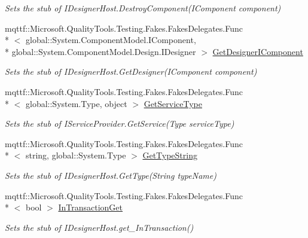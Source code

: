 \begin{DoxyCompactItemize}
\begin{DoxyCompactList}\small\item\em Sets the stub of I\-Designer\-Host.\-Destroy\-Component(\-I\-Component component)\end{DoxyCompactList}\item 
mqttf\-::\-Microsoft.\-Quality\-Tools.\-Testing.\-Fakes.\-Fakes\-Delegates.\-Func\\*
$<$ global\-::\-System.\-Component\-Model.\-I\-Component, \\*
global\-::\-System.\-Component\-Model.\-Design.\-I\-Designer $>$ \hyperlink{class_system_1_1_component_model_1_1_design_1_1_fakes_1_1_stub_i_designer_host_a0b6b680c2ff6b92b3961fe44d4f22c78}{Get\-Designer\-I\-Component}
\begin{DoxyCompactList}\small\item\em Sets the stub of I\-Designer\-Host.\-Get\-Designer(\-I\-Component component)\end{DoxyCompactList}\item 
mqttf\-::\-Microsoft.\-Quality\-Tools.\-Testing.\-Fakes.\-Fakes\-Delegates.\-Func\\*
$<$ global\-::\-System.\-Type, object $>$ \hyperlink{class_system_1_1_component_model_1_1_design_1_1_fakes_1_1_stub_i_designer_host_aba285626157fda6ca344b0294a61f534}{Get\-Service\-Type}
\begin{DoxyCompactList}\small\item\em Sets the stub of I\-Service\-Provider.\-Get\-Service(\-Type service\-Type)\end{DoxyCompactList}\item 
mqttf\-::\-Microsoft.\-Quality\-Tools.\-Testing.\-Fakes.\-Fakes\-Delegates.\-Func\\*
$<$ string, global\-::\-System.\-Type $>$ \hyperlink{class_system_1_1_component_model_1_1_design_1_1_fakes_1_1_stub_i_designer_host_a40e758ff918a0cc7e83fc6cd2b2d335a}{Get\-Type\-String}
\begin{DoxyCompactList}\small\item\em Sets the stub of I\-Designer\-Host.\-Get\-Type(\-String type\-Name)\end{DoxyCompactList}\item 
mqttf\-::\-Microsoft.\-Quality\-Tools.\-Testing.\-Fakes.\-Fakes\-Delegates.\-Func\\*
$<$ bool $>$ \hyperlink{class_system_1_1_component_model_1_1_design_1_1_fakes_1_1_stub_i_designer_host_a900e7faac6c188dc65a0e912b66afd12}{In\-Transaction\-Get}
\begin{DoxyCompactList}\small\item\em Sets the stub of I\-Designer\-Host.\-get\-\_\-\-In\-Transaction()\end{DoxyCompactList}\item 

\end{DoxyCompactItemize}
